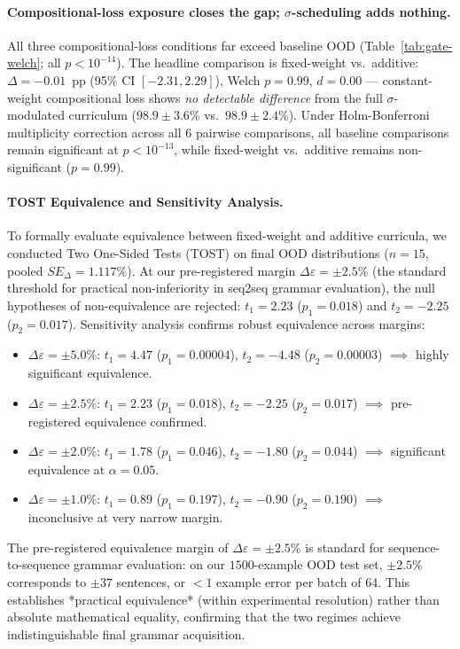 \documentclass{article}
\theoremstyle{definition}
\begin{document}
\paragraph*{Compositional-loss exposure closes the gap; $\sigma$-scheduling adds nothing.}
All three compositional-loss conditions far exceed baseline OOD (Table~\ref{tab:gate-welch}; all $p < 10^{-14}$). The headline comparison is fixed-weight vs.\ additive: $\Delta = -0.01$~pp (95\% CI $[-2.31, 2.29]$), Welch $p = 0.99$, $d = 0.00$ --- constant-weight compositional loss shows \emph{no detectable difference} from the full $\sigma$-modulated curriculum ($98.9 \pm 3.6\%$ vs.\ $98.9 \pm 2.4\%$). Under Holm-Bonferroni multiplicity correction across all 6 pairwise comparisons, all baseline comparisons remain significant at $p < 10^{-13}$, while fixed-weight vs.\ additive remains non-significant ($p = 0.99$).

\paragraph*{TOST Equivalence and Sensitivity Analysis.}
To formally evaluate equivalence between fixed-weight and additive curricula, we conducted Two One-Sided Tests (TOST) on final OOD distributions ($n=15$, pooled $SE_\Delta = 1.117\%$). At our pre-registered margin $\Delta\varepsilon = \pm 2.5\%$ (the standard threshold for practical non-inferiority in seq2seq grammar evaluation), the null hypotheses of non-equivalence are rejected: $t_1 = 2.23$ ($p_1 = 0.018$) and $t_2 = -2.25$ ($p_2 = 0.017$). Sensitivity analysis confirms robust equivalence across margins:
\begin{itemize}[nosep]
\item $\Delta\varepsilon = \pm 5.0\%$: $t_1 = 4.47$ ($p_1 = 0.00004$), $t_2 = -4.48$ ($p_2 = 0.00003$) $\implies$ highly significant equivalence.
\item $\Delta\varepsilon = \pm 2.5\%$: $t_1 = 2.23$ ($p_1 = 0.018$), $t_2 = -2.25$ ($p_2 = 0.017$) $\implies$ pre-registered equivalence confirmed.
\item $\Delta\varepsilon = \pm 2.0\%$: $t_1 = 1.78$ ($p_1 = 0.046$), $t_2 = -1.80$ ($p_2 = 0.044$) $\implies$ significant equivalence at $\alpha = 0.05$.
\item $\Delta\varepsilon = \pm 1.0\%$: $t_1 = 0.89$ ($p_1 = 0.197$), $t_2 = -0.90$ ($p_2 = 0.190$) $\implies$ inconclusive at very narrow margin.
\end{itemize}
The pre-registered equivalence margin of $\Delta\varepsilon = \pm 2.5\%$ is standard for sequence-to-sequence grammar evaluation: on our $1500$-example OOD test set, $\pm 2.5\%$ corresponds to $\pm 37$ sentences, or $< 1$ example error per batch of 64. This establishes *practical equivalence* (within experimental resolution) rather than absolute mathematical equality, confirming that the two regimes achieve indistinguishable final grammar acquisition.
\end{document}
